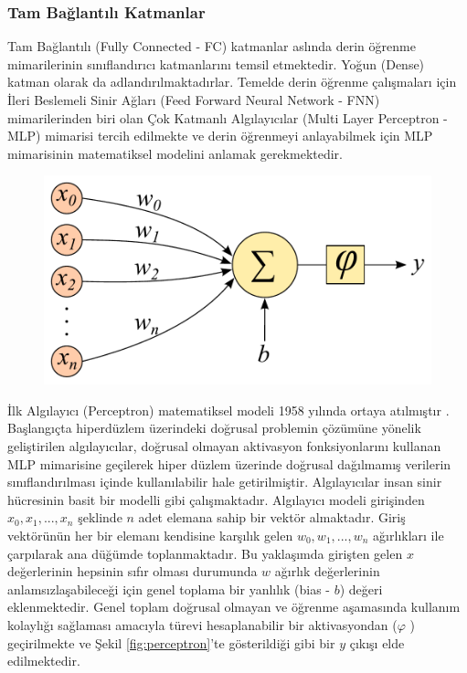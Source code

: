 \subsubsection{Tam Bağlantılı Katmanlar}
Tam Bağlantılı (Fully Connected - FC) katmanlar aslında derin öğrenme mimarilerinin sınıflandırıcı katmanlarını temsil etmektedir. Yoğun (Dense) katman olarak da adlandırılmaktadırlar. Temelde derin öğrenme çalışmaları için İleri Beslemeli Sinir Ağları (Feed Forward Neural Network - FNN) mimarilerinden biri olan Çok Katmanlı Algılayıcılar (Multi Layer Perceptron - MLP) mimarisi tercih edilmekte ve derin öğrenmeyi anlayabilmek için MLP mimarisinin matematiksel modelini anlamak gerekmektedir.

\begin{figure}[h!]
	\begin{center}
		\vspace{0.4cm}
		{
			\vspace{0.4cm}
			\includegraphics[scale=0.55]{Yapilan-Calismalar/Figures/perceptron.pdf}
		}
	\end{center}
\end{figure}

İlk Algılayıcı (Perceptron) matematiksel modeli 1958 yılında ortaya atılmıştır \cite{rosenblatt1957perceptron}. Başlangıçta hiperdüzlem üzerindeki doğrusal problemin çözümüne yönelik geliştirilen algılayıcılar, doğrusal olmayan aktivasyon fonksiyonlarını kullanan MLP mimarisine geçilerek hiper düzlem üzerinde doğrusal dağılmamış verilerin sınıflandırılması içinde kullanılabilir hale getirilmiştir. Algılayıcılar insan sinir hücresinin basit bir modelli gibi çalışmaktadır. Algılayıcı modeli girişinden $x_{0}, x_{1},..., x_{n}$ şeklinde  $n$ adet elemana sahip bir vektör almaktadır. Giriş vektörünün her bir elemanı kendisine karşılık gelen $w_{0}, w_{1},..., w_{n}$ ağırlıkları ile çarpılarak ana düğümde toplanmaktadır. Bu yaklaşımda girişten gelen $x$ değerlerinin hepsinin sıfır olması durumunda $w$ ağırlık değerlerinin anlamsızlaşabileceği için genel toplama bir yanlılık (bias - $b$) değeri eklenmektedir. Genel toplam doğrusal olmayan ve öğrenme aşamasında kullanım kolaylığı sağlaması amacıyla türevi hesaplanabilir bir aktivasyondan ($\varphi$ ) geçirilmekte ve Şekil \ref{fig:perceptron}'te gösterildiği gibi bir $y$ çıkışı elde edilmektedir. 

